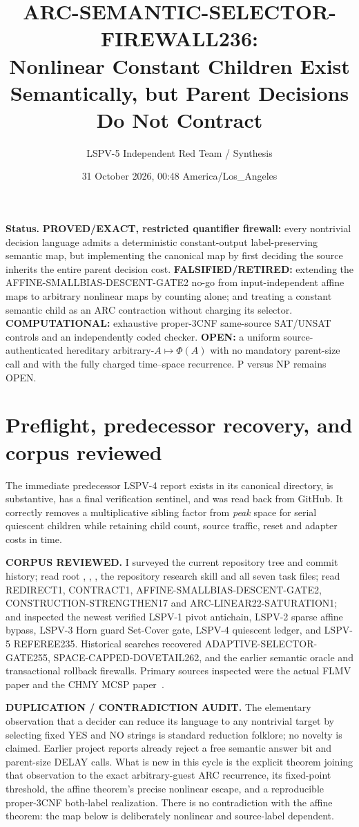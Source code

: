 \documentclass[11pt]{article}
\title{ARC-SEMANTIC-SELECTOR-FIREWALL236:\\
Nonlinear Constant Children Exist Semantically, but Parent Decisions Do Not Contract}
\author{LSPV-5 Independent Red Team / Synthesis}
\date{31 October 2026, 00:48 America/Los\_Angeles}
\begin{document}
\maketitle

\noindent\textbf{Status.}
\textbf{PROVED/EXACT, restricted quantifier firewall:} every nontrivial decision
language admits a deterministic constant-output label-preserving semantic map,
but implementing the canonical map by first deciding the source inherits the
entire parent decision cost.  \textbf{FALSIFIED/RETIRED:} extending the
AFFINE-SMALLBIAS-DESCENT-GATE2 no-go from input-independent affine maps to
arbitrary nonlinear maps by counting alone; and treating a constant semantic
child as an ARC contraction without charging its selector.  \textbf{COMPUTATIONAL:}
exhaustive proper-3CNF same-source SAT/UNSAT controls and an independently coded
checker.  \textbf{OPEN:} a uniform source-authenticated hereditary
arbitrary-$A\mapsto\Phi(A)$ with no mandatory parent-size call and with the
fully charged time--space recurrence.  P versus NP remains OPEN.

\section{Preflight, predecessor recovery, and corpus reviewed}
The immediate predecessor LSPV-4 report
exists in its canonical directory, is substantive, has a final verification
sentinel, and was read back from GitHub.  It correctly removes a multiplicative
sibling factor from \emph{peak} space for serial quiescent children while
retaining child count, source traffic, reset and adapter costs in time.

\textbf{CORPUS REVIEWED.}  I surveyed the current repository tree and commit
history; read root , , , the
repository research skill and all seven task files; read REDIRECT1, CONTRACT1,
AFFINE-SMALLBIAS-DESCENT-GATE2, CONSTRUCTION-STRENGTHEN17 and
ARC-LINEAR22-SATURATION1; and inspected the newest verified LSPV-1 pivot
antichain, LSPV-2 sparse affine bypass, LSPV-3 Horn guard Set-Cover gate,
LSPV-4 quiescent ledger, and LSPV-5 REFEREE235.  Historical searches recovered
ADAPTIVE-SELECTOR-GATE255, SPACE-CAPPED-DOVETAIL262, and the earlier semantic
oracle and transactional rollback firewalls.  Primary sources inspected were
the actual FLMV paper and the CHMY MCSP paper~\cite{flmv,chmy}.

\textbf{DUPLICATION / CONTRADICTION AUDIT.}  The elementary observation that a
decider can reduce its language to any nontrivial target by selecting fixed YES
and NO strings is standard reduction folklore; no novelty is claimed.  Earlier
project reports already reject a free semantic answer bit and parent-size
DELAY calls.  What is new in this cycle is the explicit theorem joining that
observation to the exact arbitrary-guest ARC recurrence, its fixed-point
threshold, the affine theorem's precise nonlinear escape, and a reproducible
proper-3CNF both-label realization.  There is no contradiction with the affine
theorem: the map below is deliberately nonlinear and source-label dependent.
\end{document}
